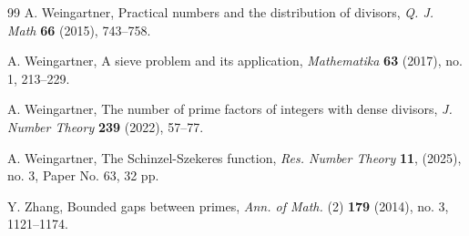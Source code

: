 \documentclass[11pt]{amsart}
\begin{document}
\begin{thebibliography}{99}
A. Weingartner, Practical numbers and the distribution of divisors, 
\textit{Q. J. Math} \textbf{66} (2015), 743--758.

A. Weingartner, A sieve problem and its application, 
\textit{Mathematika} \textbf{63} (2017), no. 1, 213--229. 

A. Weingartner, The number of prime factors of integers with dense divisors, \textit{J. Number Theory} \textbf{239} (2022), 57--77.

A. Weingartner, The Schinzel-Szekeres function, \textit{Res. Number Theory} \textbf{11}, (2025), no. 3, Paper No. 63, 32 pp.

Y. Zhang, 
Bounded gaps between primes,
\textit{Ann. of Math.} (2) \textbf{179} (2014), no. 3, 1121--1174.

\end{thebibliography}
\end{document}
